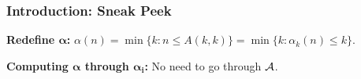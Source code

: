 \begin{frame}
\frametitle{Introduction: Sneak Peek}


\textbf{Redefine $\bm{\alpha}$:}
$\alpha(n) = \min\{k: n\le A(k, k) \} = \min\{k: \alpha_k(n)\le k \}$.

\bigskip

\pause
\textbf{Computing $\bm{\alpha} $ through $\bm{\alpha_i}$:} No need to go through $\mathcal{A}$.

\bigskip

\pause
{}

\end{frame}






